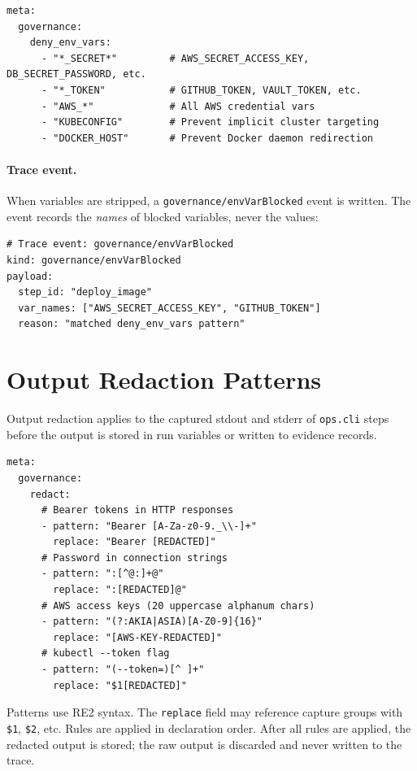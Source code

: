 \begin{verbatim}
meta:
  governance:
    deny_env_vars:
      - "*_SECRET*"         # AWS_SECRET_ACCESS_KEY, DB_SECRET_PASSWORD, etc.
      - "*_TOKEN"           # GITHUB_TOKEN, VAULT_TOKEN, etc.
      - "AWS_*"             # All AWS credential vars
      - "KUBECONFIG"        # Prevent implicit cluster targeting
      - "DOCKER_HOST"       # Prevent Docker daemon redirection
\end{verbatim}

\paragraph{Trace event.} When variables are stripped, a \texttt{governance/envVarBlocked}
event is written. The event records the \emph{names} of blocked variables, never the values:

\begin{verbatim}
# Trace event: governance/envVarBlocked
kind: governance/envVarBlocked
payload:
  step_id: "deploy_image"
  var_names: ["AWS_SECRET_ACCESS_KEY", "GITHUB_TOKEN"]
  reason: "matched deny_env_vars pattern"
\end{verbatim}

\section{Output Redaction Patterns}
\label{sec:governance-redaction}

Output redaction applies to the captured stdout and stderr of \texttt{ops.cli} steps before
the output is stored in run variables or written to evidence records.

\begin{verbatim}
meta:
  governance:
    redact:
      # Bearer tokens in HTTP responses
      - pattern: "Bearer [A-Za-z0-9._\\-]+"
        replace: "Bearer [REDACTED]"
      # Password in connection strings
      - pattern: ":[^@:]+@"
        replace: ":[REDACTED]@"
      # AWS access keys (20 uppercase alphanum chars)
      - pattern: "(?:AKIA|ASIA)[A-Z0-9]{16}"
        replace: "[AWS-KEY-REDACTED]"
      # kubectl --token flag
      - pattern: "(--token=)[^ ]+"
        replace: "$1[REDACTED]"
\end{verbatim}

Patterns use RE2 syntax. The \texttt{replace} field may reference capture groups with
\texttt{\$1}, \texttt{\$2}, etc. Rules are applied in declaration order. After all rules
are applied, the redacted output is stored; the raw output is discarded and never written
to the trace.

